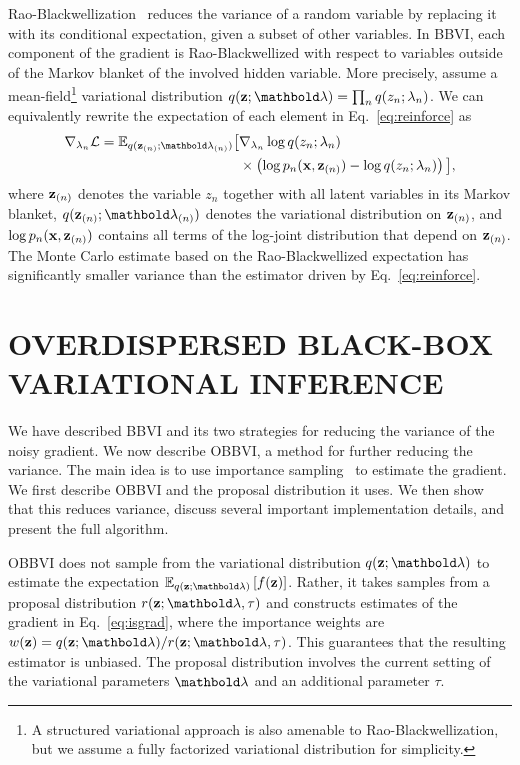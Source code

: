 \documentclass[]{article}
\begin{document}
Rao-Blackwellization~\citep{Casella1996} reduces the variance of a
random variable by replacing it with its conditional expectation,
given a subset of other variables. In \gls{BBVI}, each component of
the gradient is Rao-Blackwellized with respect to variables outside of
the Markov blanket of the involved hidden variable. More precisely,
assume a mean-field\footnote{A structured
  variational approach is also amenable to Rao-Blackwellization, but
  we assume a fully factorized variational distribution for
  simplicity.} variational distribution
$q(\bz;\blambda)=\prod_n q(z_n;\lambda_n)$.
We can equivalently rewrite the expectation of each
element in Eq.~\ref{eq:reinforce} as
\begin{align}
  \label{eq:rao-blackwell}
  \begin{split}
    \nabla_{\lambda_n} \Lcal = \mathbb{E}_{q(\bz_{(n)};\blambda_{(n)})} \big[& \nabla_{\lambda_n} \log q(z_n;\lambda_n) \\
    & \times\left(\log p_n(\bx,\bz_{(n)})-\log q(z_n;\lambda_n)\right) \big],
  \end{split}
\end{align}
where $\mathbf{z}_{(n)}$ denotes the variable $z_n$ together with all latent
variables in its Markov blanket, $q(\bz_{(n)};\blambda_{(n)})$ denotes the
variational distribution on $\mathbf{z}_{(n)}$, and $\log p_n(\mathbf{x},\mathbf{z}_{(n)})$
contains all terms of the log-joint distribution that depend on
$\mathbf{z}_{(n)}$.  The Monte Carlo estimate based on the Rao-Blackwellized
expectation has significantly smaller variance than the estimator
driven by Eq.~\ref{eq:reinforce}.


\section{OVERDISPERSED BLACK-BOX VARIATIONAL INFERENCE}
\label{sec:isbbvi}

We have described \gls{BBVI} and its two strategies for reducing the
variance of the noisy gradient.  We now describe \gls{OBBVI}, a method
for further reducing the variance.  The main idea is to use importance
sampling~\citep{Robert2005} to estimate the gradient.  We first
describe \gls{OBBVI} and the proposal distribution it uses.  We then
show that this reduces variance, discuss several important
implementation details, and present the full algorithm.

\gls{OBBVI} does not sample from the variational distribution
$q(\bz;\blambda)$ to estimate the expectation
$\E{q(\bz;\blambda)}{f(\bz)}$.  Rather, it takes samples from a
proposal distribution $r(\bz; \blambda, \tau)$ and constructs
estimates of the gradient in Eq.~\ref{eq:isgrad}, where the
importance weights are
$w(\bz) = q(\bz;\blambda)/r(\bz; \blambda, \tau)$. This guarantees
that the resulting estimator is unbiased. The proposal
distribution involves the current setting of the variational
parameters $\blambda$ and an additional parameter $\tau$. 
\end{document}
